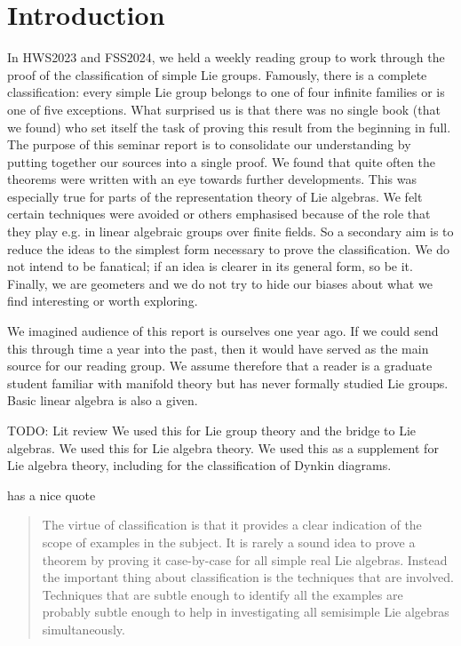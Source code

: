 \section{Introduction}

In HWS2023 and FSS2024, we held a weekly reading group to work through the proof of the classification of simple Lie groups.
Famously, there is a complete classification: every simple Lie group belongs to one of four infinite families or is one of five exceptions.
What surprised us is that there was no single book (that we found) who set itself the task of proving this result from the beginning in full.
The purpose of this seminar report is to consolidate our understanding by putting together our sources into a single proof.
We found that quite often the theorems were written with an eye towards further developments.
This was especially true for parts of the representation theory of Lie algebras.
We felt certain techniques were avoided or others emphasised because of the role that they play e.g. in linear algebraic groups over finite fields.
So a secondary aim is to reduce the ideas to the simplest form necessary to prove the classification.
We do not intend to be fanatical; if an idea is clearer in its general form, so be it.
Finally, we are geometers and we do not try to hide our biases about what we find interesting or worth exploring.

We imagined audience of this report is ourselves one year ago.
If we could send this through time a year into the past, then it would have served as the main source for our reading group. 
We assume therefore that a reader is a graduate student familiar with manifold theory but has never formally studied Lie groups.
Basic linear algebra is also a given.

TODO: Lit review
\cite{Warner1983} We used this for Lie group theory and the bridge to Lie algebras.
\cite{Hall2015} We used this for Lie algebra theory.
\cite{Fulton2004} We used this as a supplement for Lie algebra theory, including for the classification of Dynkin diagrams.

\cite[p.~349]{Knapp1986} has a nice quote 
\begin{quotation}
The virtue of classification is that it provides a clear indication of
the scope of examples in the subject. It is rarely a sound idea to prove
a theorem by proving it case-by-case for all simple real Lie algebras.
Instead the important thing about classification is the techniques that are
involved. Techniques that are subtle enough to identify all the examples
are probably subtle enough to help in investigating all semisimple Lie
algebras simultaneously.
\end{quotation}

